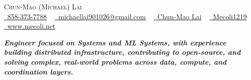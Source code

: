 
\begin{center}
    {\huge \scshape Chun-Mao (Michael) Lai} \\ \vspace{0pt}
    \href{tel:858-373-7788}{\raisebox{-0.1\height}\faPhone\ \underline{858-373-7788}} ~ 
    \href{mailto:michaellai901026@gmail.com}{\raisebox{-0.1\height}\faEnvelope\  \underline{michaellai901026@gmail.com}} ~ 
    \href{https://www.linkedin.com/in/chun-mao-lai-aa1966229}{\raisebox{-0.1\height}\faLinkedin\ \underline{Chun-Mao Lai}}  ~
    \href{https://github.com/Mecoli1219}{\raisebox{-0.1\height}\faGithub\ \underline{Mecoli1219}}~
    \href{https://www.mecoli.net}{\raisebox{-0.1\height}\faHome\ \underline{www.mecoli.net}}\\
\end{center}
\vspace{-2pt}
\noindent
\hspace*{0.1\linewidth}
\parbox{0.8\linewidth}{
    \centering
    \small \textbf{\textit{Engineer focused on Systems and ML Systems, with experience building distributed infrastructure, contributing to open-source, and solving complex, real-world problems across data, compute, and coordination layers.}}
}
\vspace{-8pt}